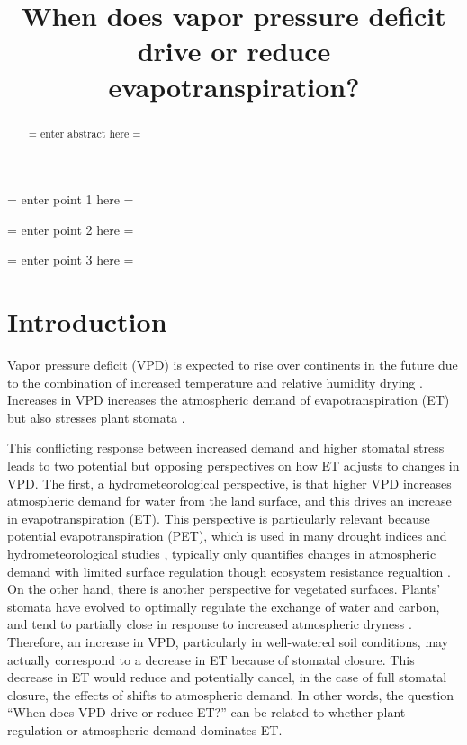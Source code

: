 \documentclass[draft,linenumbers]{agujournal}
\begin{document}
\title{When does vapor pressure deficit drive or reduce evapotranspiration?}





\begin{keypoints}
\item = enter point 1 here = 
\item = enter point 2 here = 
\item = enter point 3 here = 
\end{keypoints}


\begin{abstract}
= enter abstract here =
\end{abstract}

\section{Introduction}

Vapor pressure deficit (VPD) is expected to rise over continents in the future due to the combination of increased temperature and relative humidity drying \citep{Byrne_2013}. Increases in VPD increases the atmospheric demand of evapotranspiration (ET) \citep{Monteith_1965} but also stresses plant stomata \citep{Leuning_1990, MEDLYN_2011}.

This conflicting response between increased demand and higher stomatal stress leads to two potential but opposing perspectives on how ET adjusts to changes in VPD. The first, a hydrometeorological perspective, is that higher VPD increases atmospheric demand for water from the land surface, and this drives an increase in evapotranspiration (ET). This perspective is particularly relevant because potential evapotranspiration (PET), which is used in many drought indices and hydrometeorological studies \citep[e.g.,][]{Heim_2002, Scheff_2015}, typically only quantifies changes in atmospheric demand with limited surface regulation though ecosystem resistance regualtion \citep{Swann_2016}. On the other hand, there is another perspective for vegetated surfaces. Plants' stomata have evolved to optimally regulate the exchange of water and carbon, and tend to partially close in response to increased atmospheric dryness \citep{Ball_1987, Leuning_1990, MEDLYN_2011}. Therefore, an increase in VPD, particularly in well-watered soil conditions, may actually correspond to a decrease in ET because of stomatal closure. This decrease in ET would reduce and potentially cancel, in the case of full stomatal closure, the effects of shifts to atmospheric demand. In other words, the  question ``When does VPD drive or reduce ET?'' can be related to whether plant regulation or atmospheric demand dominates ET.
\end{document}
